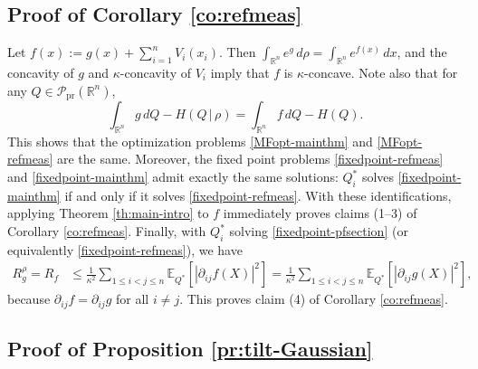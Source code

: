\documentclass[11pt,reqno]{amsart}
\numberwithin{equation}{section}
\theoremstyle{definition}
\def\E{{\mathbb E}}
\def\R{{\mathbb R}}
\def\P{{\mathcal P}}
\def\Pprod{\P_{\mathrm{pr}}}
\begin{document}
\subsection{Proof of Corollary \ref{co:refmeas}} \label{subsec: proofs-refprob}

	Let $f(x) := g(x) + \sum_{i=1}^nV_i(x_i) $.
	Then $ \int_{\R^n} e^g\,d\rho = \int_{\R^n} e^{f(x)}\,dx$, and the concavity of $g$ and $\kappa$-concavity of $V_i$ imply that $f$ is $\kappa$-concave. 
	Note also that for any $Q \in \Pprod(\R^n)$,
	\begin{equation*}
		\int_{\R^n} g\,dQ- H(Q\,|\,\rho) = \int_{\R^n} f\,dQ - H(Q).
	\end{equation*}
This shows that the optimization problems \eqref{MFopt-mainthm} and \eqref{MFopt-refmeas} are the same.
Moreover, the fixed point problems \eqref{fixedpoint-refmeas} and \eqref{fixedpoint-mainthm} admit exactly the same solutions: $Q^*_i$ solves \eqref{fixedpoint-mainthm} if and only if it solves \eqref{fixedpoint-refmeas}. With these identifications, applying Theorem \ref{th:main-intro} to $f$ immediately proves
claims (1--3) of Corollary \ref{co:refmeas}.
Finally, 
with $Q^*_i$  solving \eqref{fixedpoint-pfsection} (or equivalently \eqref{fixedpoint-refmeas}), we have
\begin{align*}
R^\rho_g = R_f &\le \frac{1}{\kappa^2}\sum_{1 \le i < j \le n} \E_{Q^*}[|\partial_{ij}f(X)|^2] = \frac{1}{\kappa^2}\sum_{1 \le i < j \le n} \E_{Q^*}[|\partial_{ij}g(X)|^2 ],
\end{align*}
	because $\partial_{ij}f=\partial_{ij}g$ for all $i \neq j$. This proves  claim (4) of Corollary \ref{co:refmeas}. \hfill\qedsymbol

\subsection{Proof of Proposition \ref{pr:tilt-Gaussian}} \label{subsec: proofs-tilts}
\end{document}
